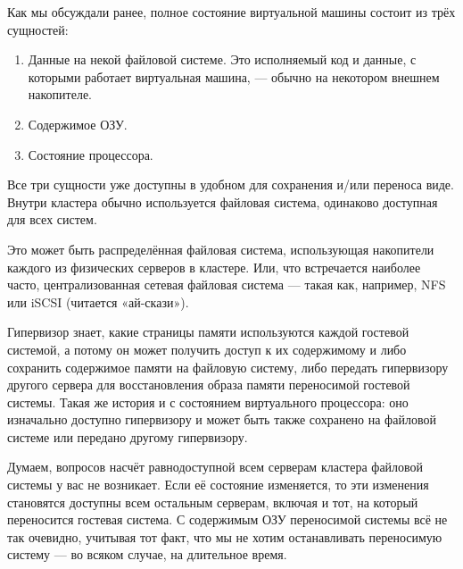 \documentclass[14pt, a4paper]{article}
\begin{document}
Как мы обсуждали ранее, полное состояние виртуальной машины состоит из трёх сущностей:

\begin{enumerate}
    \item Данные на некой файловой системе. Это исполняемый код и данные, с которыми работает
    виртуальная машина, — обычно на некотором внешнем накопителе.
    \item Содержимое ОЗУ.
    \item Состояние процессора.
\end{enumerate}

Все три сущности уже доступны в удобном для сохранения и/или переноса виде. Внутри кластера
обычно используется файловая система, одинаково доступная для всех систем.

\begin{figure}[h]%
    \centering
    \label{framework} %
\end{figure}

Это может быть распределённая файловая система, использующая накопители каждого из
физических серверов в кластере. Или, что встречается наиболее часто, централизованная сетевая
файловая система — такая как, например, NFS или iSCSI (читается «ай-скази»).

Гипервизор знает, какие страницы памяти используются каждой гостевой системой, а потому он может
получить доступ к их содержимому и либо сохранить содержимое памяти на файловую систему, либо
передать гипервизору другого сервера для восстановления образа памяти переносимой гостевой
системы. Такая же история и с состоянием виртуального процессора: оно изначально доступно
гипервизору и может быть также сохранено на файловой системе или передано другому гипервизору.

Думаем, вопросов насчёт равнодоступной всем серверам кластера файловой системы у вас не
возникает. Если её состояние изменяется, то эти изменения становятся доступны всем остальным
серверам, включая и тот, на который переносится гостевая система. С содержимым ОЗУ переносимой
системы всё не так очевидно, учитывая тот факт, что мы не хотим останавливать переносимую
систему — во всяком случае, на длительное время.
\end{document}
